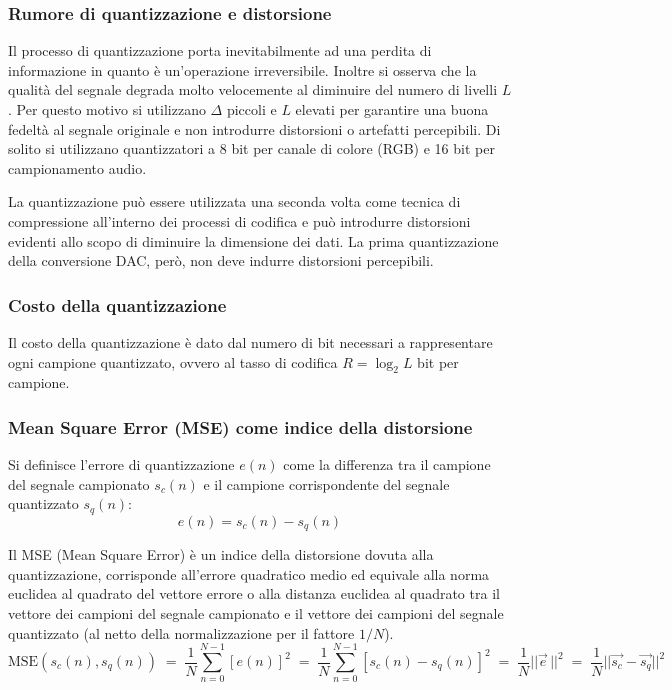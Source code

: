 \subsubsection*{Rumore di quantizzazione e distorsione}
Il processo di quantizzazione porta inevitabilmente ad una perdita di informazione in quanto è un'operazione irreversibile.
Inoltre si osserva che la qualità del segnale degrada molto velocemente al diminuire del numero di livelli \(L\). Per questo
motivo si utilizzano \(\Delta\) piccoli e \(L\) elevati per garantire una buona fedeltà al segnale originale e non introdurre
distorsioni o artefatti percepibili. Di solito si utilizzano quantizzatori a 8 bit per canale di colore (RGB) e 16 bit per
campionamento audio.

La quantizzazione può essere utilizzata una seconda volta come tecnica di compressione all'interno dei processi di codifica
e può introdurre distorsioni evidenti allo scopo di diminuire la dimensione dei dati. La prima quantizzazione della
conversione DAC, però, non deve indurre distorsioni percepibili.

\subsubsection*{Costo della quantizzazione}
Il costo della quantizzazione è dato dal numero di bit necessari a rappresentare ogni campione quantizzato, ovvero al tasso
di codifica \(R = \log_2 L\) bit per campione.

\subsubsection*{Mean Square Error (MSE) come indice della distorsione}
Si definisce l'errore di quantizzazione \(e(n)\) come la differenza tra il campione del segnale campionato \(s_c(n)\) e
il campione corrispondente del segnale quantizzato \(s_q(n)\):
\[e(n) = s_c(n) - s_q(n)\]

\noindent
Il MSE (Mean Square Error) è un indice della distorsione dovuta alla quantizzazione, corrisponde all'errore quadratico
medio ed equivale alla norma euclidea al quadrato del vettore errore o alla distanza euclidea al quadrato tra il vettore
dei campioni del segnale campionato e il vettore dei campioni del segnale quantizzato (al netto della normalizzazione
per il fattore \(1/N\)).
\[\text{MSE}(s_c(n), s_q(n)) \; = \; \frac{1}{N} \sum_{n=0}^{N-1} [e(n)]^2 \; = \; \frac{1}{N} \sum_{n=0}^{N-1} [s_c(n) - s_q(n)]^2 \; = \; \frac{1}{N} ||\vec{e} \, ||^2 \; = \; \frac{1}{N} ||\vec{s_c} - \vec{s_q}||^2\]

